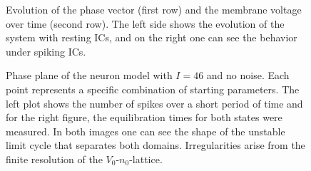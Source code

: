 \documentclass[12pt,a4paper]{article}
\begin{document}
\begin{figure}[H]
	\caption{Evolution of the phase vector (first row) and the membrane voltage over time (second row). The left side shows the evolution of the system with resting ICs, and on the right one can see the behavior under spiking ICs.}
	\label{subfigah} 
\end{figure}

\begin{figure}[H]
	\hspace*{-0.5cm}
	
	\caption{Phase plane of the neuron model with $I=46$ and no noise. Each point represents a specific combination of starting parameters. The left plot shows the number of spikes over a short period of time and for the right figure, the equilibration times for both states were measured. In both images one can see the shape of the unstable limit cycle that separates both domains. Irregularities arise from the finite resolution of the $V_0$-$n_0$-lattice.}
	\label{twodom2}
\end{figure}
\end{document}
